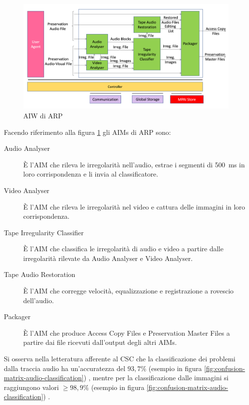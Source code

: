 \begin{figure}[H]
    \centering
    \includegraphics[width=\textwidth]{img/arp-workflow.png}
    \caption{\ac{AIW} di \acl{ARP}}
    \label{fig:arp-workflow}
\end{figure}

Facendo riferimento alla figura \ref{fig:arp-workflow} gli \acp{AIM} di \ac{ARP} sono:
\begin{description}
    \item[Audio Analyser] È l'\ac{AIM} che rileva le irregolarità nell'audio, estrae i segmenti di \qty{500}{\ms} in loro corrispondenza e li invia al classificatore.
    \item[Video Analyser] È l'\ac{AIM} che rileva le irregolarità nel video e cattura delle immagini in loro corrispondenza.
    \item[Tape Irregularity Classifier] È l'\ac{AIM} che classifica le irregolarità di audio e video a partire dalle irregolarità rilevate da Audio Analyser e Video Analyser.
    \item[Tape Audio Restoration] È l'\ac{AIM} che corregge velocità, equalizzazione e registrazione a rovescio dell'audio.
    \item[Packager] È l'\ac{AIM} che produce Access Copy Files e Preservation Master Files a partire dai file ricevuti dall'output degli altri \acp{AIM}.
\end{description}

Si osserva nella letteratura afferente al \ac{CSC} che la classificazione dei problemi dalla traccia audio ha un'accuratezza del $93,7\%$ (esempio in figura \ref{fig:confusion-matrix-audio-classification}) \cite[min. 35:10]{mpaistandardsMPAIPresentsContextbased2023}, mentre per la classificazione dalle immagini si raggiungono valori $\geq 98,9\%$ (esempio in figura \ref{fig:confusion-matrix-audio-classification}) \cite[fig. 3 e p. 70]{prettoComputingMethodologiesSupporting2018}.

